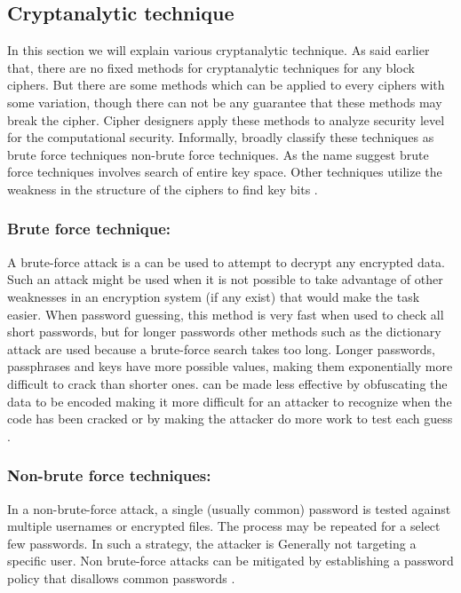 \subsection{Cryptanalytic technique}
In this section we will explain various cryptanalytic technique. As said earlier that, there are no fixed methods for cryptanalytic techniques for any block ciphers. But there are some methods which can be applied to every ciphers with some variation, though there can not be any guarantee that these methods may break the cipher. Cipher designers apply these methods to analyze security level for the computational security. Informally, broadly classify these techniques as brute force techniques non-brute force techniques. As the name suggest brute force techniques involves search of entire key space. Other techniques utilize the weakness in the structure of the ciphers to find key bits \cite{jha2011cryptanalysis}.

\subsubsection{Brute force technique:}
A brute-force attack is a can be used to attempt to decrypt any
encrypted data. Such an attack might be used when it is not possible to take
advantage of other weaknesses in an encryption system (if any exist) that
would make the task easier. When password guessing, this method is very
fast when used to check all short passwords, but for longer passwords other
methods such as the dictionary attack are used because a brute-force search
takes too long. Longer passwords, passphrases and keys have more
possible values, making them exponentially more difficult to crack than
shorter ones. can be made less effective by obfuscating the data to be
encoded making it more difficult for an attacker to recognize when the code
has been cracked or by making the attacker do more work to test each guess \cite{jha2011cryptanalysis}.

\subsubsection{Non-brute force techniques:}
In a non-brute-force attack, a single (usually common) password is
tested against multiple usernames or encrypted files. The process may be
repeated for a select few passwords. In such a strategy, the attacker is
Generally not targeting a specific user. Non brute-force attacks can be
mitigated by establishing a password policy that disallows common
passwords \cite{jha2011cryptanalysis}.
\newpage
